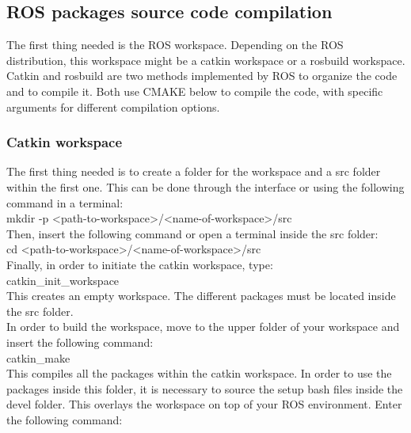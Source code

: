 \subsection{ROS packages source code compilation}
The first thing needed is the ROS workspace. Depending on the ROS distribution, this workspace might be a catkin workspace or a rosbuild workspace. 
\\

Catkin and rosbuild are two methods implemented by ROS to organize the code and to compile it. Both use CMAKE below to compile the code, with specific arguments for different compilation options. 
\\

\subsubsection{Catkin workspace}
The first thing needed is to create a folder for the workspace and a src folder within the first one. This can be done through the interface or using the following command in a terminal: 
\\

mkdir -p <path-to-workspace>/<name-of-workspace>/src\\

Then, insert the following command or open a terminal inside the src folder: \\

cd <path-to-workspace>/<name-of-workspace>/src\\

Finally, in order to initiate the catkin workspace, type: \\

catkin\_init\_workspace\\

This creates an empty workspace. The different packages must be located inside the src folder. \\

In order to build the workspace, move to the upper folder of your workspace and insert the following command: \\

catkin\_make\\

This compiles all the packages within the catkin workspace. In order to use the packages inside this folder, it is necessary to source the setup bash files inside the devel folder. This overlays the workspace on top of your ROS environment. Enter the following command: \\

